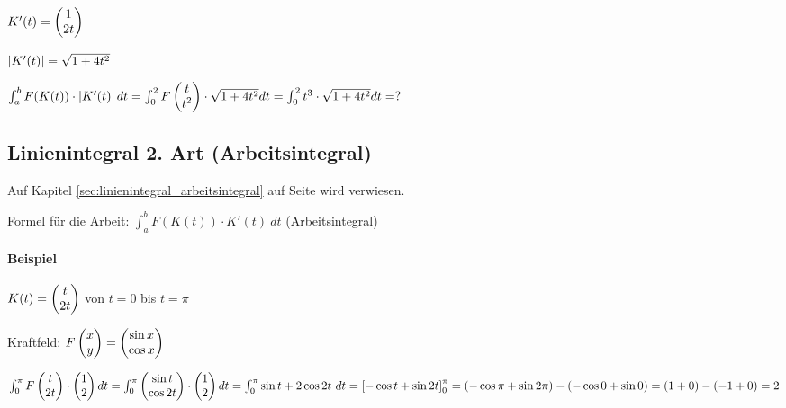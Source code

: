 $ K'(t) =  \begin{pmatrix} 1\\2t \end{pmatrix}  $

$  \left\vert K'(t) \right\vert  = \sqrt{1 + 4 t^2} $

$ \int_{a}^{b} F(K(t)) \cdot  \left\vert K'(t) \right\vert  dt 
= \int_0^2 F \begin{pmatrix} t\\t^2 \end{pmatrix}  \cdot \sqrt{1 + 4t^2} dt
= \int_{0}^{2} t^3 \cdot \sqrt{1 + 4t^2} dt
= ?
$

\subsection{Linienintegral 2. Art (Arbeitsintegral)}
Auf Kapitel \ref{sec:linienintegral_arbeitsintegral} auf Seite \pageref{sec:linienintegral_arbeitsintegral} wird verwiesen. 

Formel für die Arbeit: $\int_{a}^{b} F(K(t)) \cdot K'(t)\ dt$ (Arbeitsintegral) 

\paragraph{Beispiel}
$ K(t) =  \begin{pmatrix} t\\2t \end{pmatrix} $ von $t=0$ bis $t=\pi$

Kraftfeld: $F \begin{pmatrix} x\\y \end{pmatrix}  =  \begin{pmatrix} \sin x\\\cos x \end{pmatrix} $

$ \int_{0}^{\pi} F \begin{pmatrix} t\\2t \end{pmatrix}  \cdot  \begin{pmatrix} 1\\2 \end{pmatrix}  dt
=\int_{0}^{\pi}  \begin{pmatrix} \sin t\\\cos 2t \end{pmatrix}  \cdot  \begin{pmatrix} 1\\2 \end{pmatrix}  dt
=\int_{0}^{\pi} \sin t + 2\cos 2t\ dt 
=  \left[ -\cos t + \sin 2t \right] _{0}^{\pi}
= (-\cos \pi + \sin 2\pi) - (-\cos 0 + \sin 0)
= (1+0)-(-1+0)
= 2 
$ 
